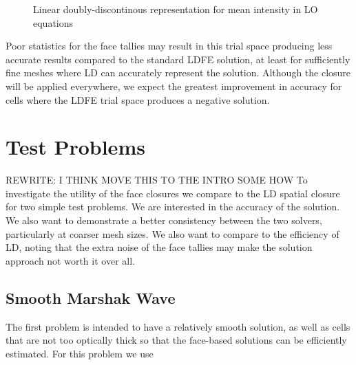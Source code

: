 \begin{figure}[H]
    \centering
    \begin{center}
    \end{center}
    \caption{Linear doubly-discontinous representation for mean intensity in LO equations}
    \label{fig:ldd_space}
\end{figure}

Poor statistics for the face tallies may result in this trial space producing less
accurate results compared to the standard LDFE solution, at least for sufficiently fine meshes where LD
can accurately represent the solution.  Although the closure will be applied everywhere,
we expect the greatest improvement in accuracy for cells where the LDFE trial space
produces a negative solution.

\section{Test Problems}

REWRITE: I THINK MOVE THIS TO THE INTRO SOME HOW
To investigate the utility of the face closures we compare to the LD spatial
closure for two simple test problems.  We are interested in the accuracy of the solution. 
We also want to demonstrate a better consistency between the two solvers, particularly at
coarser mesh sizes.  We also want to compare to the efficiency of LD, noting that the
extra noise of the face tallies may make the solution approach not worth it over all.

\subsection{Smooth Marshak Wave}

The first problem is intended to have a relatively smooth solution, as well as cells that
are not too optically thick so that the face-based solutions can be efficiently estimated.
For this problem we use


